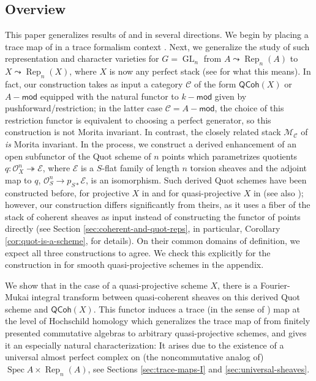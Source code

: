\documentclass{article}
\numberwithin{equation}{section}
\theoremstyle{quest}
\theoremstyle{definition}
\theoremstyle{remark}
\newcommand{\msf}{\mathsf}
\newcommand{\Mod}{-\msf{mod}}
\DeclareMathOperator{\GL}{GL}
\DeclareMathOperator{\Spec}{Spec}
\DeclareMathOperator{\Rep}{Rep}
\begin{document}
\subsection{Overview}
This paper generalizes results of \cite{BKR} and \cite{symplectic-structure} in several directions. We begin by placing a trace map of \cite{BKR} in a trace formalism context \cite{TFT,HSS,nonlinear-trace}. Next, we generalize the study of such representation and character varieties  for $G=\GL_n$ from $A\leadsto \Rep_n(A)$ to $X\leadsto \Rep_n(X)$, where $X$ is now any perfect stack (see \cite{BFN} for what this means). In fact, our construction takes as input a category $\mathcal{C}$ of the form $\mathsf{QCoh}(X)$ or $A\Mod$ equipped with the natural functor to $k\Mod$ given by pushforward/restriction; in the latter case $\mathcal{C}=A\Mod$, the choice of this restriction functor is equivalent to choosing a perfect generator, so this construction is not Morita invariant. In contrast, the closely related stack $\mathscr{M}_{\mathcal{C}}$ of \cite{TV} \textit{is} Morita invariant. In the process, we construct a derived enhancement of an open subfunctor of the Quot scheme of $n$ points which parametrizes quotients $q:\mathscr{O}^n_X\twoheadrightarrow \mathscr{E}$, where $\mathscr{E}$ is a $S$-flat family of length $n$ torsion sheaves and the adjoint map to $q$, $\mathscr{O}^n_S\to p_{S*}\mathscr{E}$, is an isomorphism. Such derived Quot schemes have been constructed before, for projective $X$ in \cite{BKSv2} and for quasi-projective $X$ in \cite{quot} (see also \cite{kapranov-quot}); however, our construction differs significantly from theirs, as it uses a fiber of the stack of coherent sheaves as input instead of constructing the functor of points directly (see Section \ref{sec:coherent-and-quot-reps}, in particular, Corollary \ref{cor:quot-is-a-scheme}, for details). On their common domains of definition, we expect all three constructions to agree. We check this explicitly for the construction in \cite{quot} for smooth quasi-projective schemes in the appendix.

We show that in the case of a quasi-projective scheme $X$, there is a Fourier-Mukai integral transform between quasi-coherent sheaves on this derived Quot scheme and $\mathsf{QCoh}(X)$. This functor induces a trace (in the sense of \cite{HSS,nonlinear-trace}) map at the level of Hochschild homology which generalizes the trace map of \cite{BKR} from finitely presented commutative algebras to arbitrary quasi-projective schemes, and gives it an especially natural characterization: It arises due to the existence of a universal almost perfect complex on (the noncommutative analog of) $\Spec A \times \Rep_n(A)$, see Sections \ref{sec:trace-maps-I} and \ref{sec:universal-sheaves}.
\end{document}

